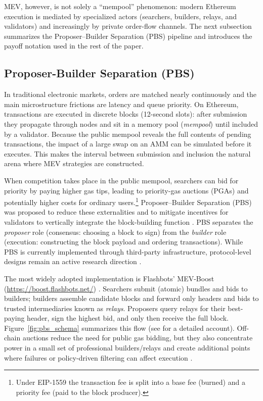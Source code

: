 \documentclass[a4paper,11pt]{article}
\begin{document}
MEV, however, is not solely a ``mempool'' phenomenon: modern Ethereum execution is mediated by specialized actors (searchers, builders, relays, and validators) and increasingly by private order-flow channels. The next subsection summarizes the Proposer--Builder Separation (PBS) pipeline and introduces the payoff notation used in the rest of the paper.

\subsection{Proposer-Builder Separation (PBS)}
In traditional electronic markets, orders are matched nearly continuously and the main microstructure frictions are latency and queue priority. On Ethereum, transactions are executed in discrete blocks (12-second slots): after submission they propagate through nodes and sit in a memory pool (\textit{mempool}) until included by a validator. Because the public mempool reveals the full contents of pending transactions, the impact of a large swap on an AMM can be simulated before it executes. This makes the interval between submission and inclusion the natural arena where MEV strategies are constructed.

When competition takes place in the public mempool, searchers can bid for priority by paying higher gas tips, leading to priority-gas auctions (PGAs) and potentially higher costs for ordinary users.\footnote{Under EIP-1559 the transaction fee is split into a base fee (burned) and a priority fee (paid to the block producer).} Proposer--Builder Separation (PBS) was proposed to reduce these externalities and to mitigate incentives for validators to vertically integrate the block-building function \cite{buterinPBS2021}. PBS separates the \textit{proposer} role (consensus: choosing a block to sign) from the \textit{builder} role (execution: constructing the block payload and ordering transactions). While PBS is currently implemented through third-party infrastructure, protocol-level designs remain an active research direction \cite{ethereumPBS2024}.

The most widely adopted implementation is Flashbots' MEV-Boost (\url{https://boost.flashbots.net/}) \cite{mevboost_pics}. Searchers submit (atomic) bundles and bids to builders; builders assemble candidate blocks and forward only headers and bids to trusted intermediaries known as \textit{relays}. Proposers query relays for their best-paying header, sign the highest bid, and only then receive the full block. Figure~\ref{fig:pbs_schema} summarizes this flow (see \cite{oz2024wins} for a detailed account). Off-chain auctions reduce the need for public gas bidding, but they also concentrate power in a small set of professional builders/relays and create additional points where failures or policy-driven filtering can affect execution \cite{marzecThibault2024,damatoNeuder2023}.
\end{document}
